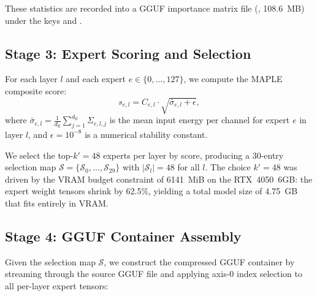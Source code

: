 \documentclass[final]{article}
\newcommand{\MAPLE}{\textsc{MAPLE}}
\begin{document}
These statistics are recorded into a GGUF importance matrix file (, 108.6~MB) under the keys  and .

\subsection{Stage 3: Expert Scoring and Selection}

For each layer $l$ and each expert $e \in \{0, \ldots, 127\}$, we compute the \MAPLE{} composite score:
\begin{equation}
  s_{e,l} = C_{e,l} \cdot \sqrt{\bar{\sigma}_{e,l} + \epsilon},
  \label{eq:score}
\end{equation}
where $\bar{\sigma}_{e,l} = \frac{1}{d_\text{ff}} \sum_{j=1}^{d_\text{ff}} \Sigma_{e,l,j}$ is the mean input energy per channel for expert $e$ in layer $l$, and $\epsilon = 10^{-8}$ is a numerical stability constant.

We select the top-$k'=48$ experts per layer by score, producing a 30-entry selection map $\mathcal{S} = \{\mathcal{S}_0, \ldots, \mathcal{S}_{29}\}$ with $|\mathcal{S}_l| = 48$ for all $l$. The choice $k'=48$ was driven by the VRAM budget constraint of 6141~MiB on the RTX~4050~6GB: the expert weight tensors shrink by 62.5\%, yielding a total model size of 4.75~GB that fits entirely in VRAM.

\subsection{Stage 4: GGUF Container Assembly}

Given the selection map $\mathcal{S}$, we construct the compressed GGUF container by streaming through the source GGUF file and applying axis-0 index selection to all per-layer expert tensors:
\end{document}
